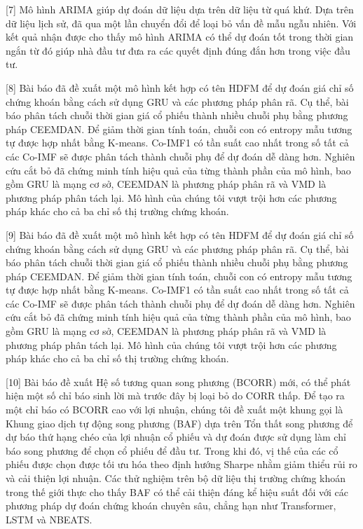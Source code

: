 \documentclass[conference]{IEEEtran}
\begin{document}
[7] Mô hình ARIMA giúp dự đoán dữ liệu dựa trên dữ liệu từ quá khứ. Dựa trên dữ liệu lịch sử, đã qua một lần chuyển đổi để loại bỏ vấn đề mẫu ngẫu nhiên. Với kết quả nhận được cho thấy mô hình ARIMA có thể dự đoán tốt trong thời gian ngắn từ đó giúp nhà đầu tư đưa ra các quyết định đúng đắn hơn trong việc đầu tư.

[8] Bài báo đã đề xuất một mô hình kết hợp có tên HDFM để dự đoán giá chỉ số chứng khoán bằng cách sử dụng GRU và các phương pháp phân rã. Cụ thể, bài báo phân tách chuỗi thời gian giá cổ phiếu thành nhiều chuỗi phụ bằng phương pháp CEEMDAN. Để giảm thời gian tính toán, chuỗi con có entropy mẫu tương tự được hợp nhất bằng K-means. Co-IMF1 có tần suất cao nhất trong số tất cả các Co-IMF sẽ được phân tách thành chuỗi phụ để dự đoán dễ dàng hơn. Nghiên cứu cắt bỏ đã chứng minh tính hiệu quả của từng thành phần của mô hình, bao gồm GRU là mạng cơ sở, CEEMDAN là phương pháp phân rã và VMD là phương pháp phân tách lại. Mô hình của chúng tôi vượt trội hơn các phương pháp khác cho cả ba chỉ số thị trường chứng khoán.

[9] Bài báo đã đề xuất một mô hình kết hợp có tên HDFM để dự đoán giá chỉ số chứng khoán bằng cách sử dụng GRU và các phương pháp phân rã. Cụ thể, bài báo phân tách chuỗi thời gian giá cổ phiếu thành nhiều chuỗi phụ bằng phương pháp CEEMDAN. Để giảm thời gian tính toán, chuỗi con có entropy mẫu tương tự được hợp nhất bằng K-means. Co-IMF1 có tần suất cao nhất trong số tất cả các Co-IMF sẽ được phân tách thành chuỗi phụ để dự đoán dễ dàng hơn. Nghiên cứu cắt bỏ đã chứng minh tính hiệu quả của từng thành phần của mô hình, bao gồm GRU là mạng cơ sở, CEEMDAN là phương pháp phân rã và VMD là phương pháp phân tách lại. Mô hình của chúng tôi vượt trội hơn các phương pháp khác cho cả ba chỉ số thị trường chứng khoán.

[10] Bài báo đề xuất Hệ số tương quan song phương (BCORR) mới, có thể phát hiện một số chỉ báo sinh lời mà trước đây bị loại bỏ do CORR thấp. Để tạo ra một chỉ báo có BCORR cao với lợi nhuận, chúng tôi đề xuất một khung gọi là Khung giao dịch tự động song phương (BAF) dựa trên Tổn thất song phương để dự báo thứ hạng chéo của lợi nhuận cổ phiếu và dự đoán được sử dụng làm chỉ báo song phương để chọn cổ phiếu để đầu tư. Trong khi đó, vị thế của các cổ phiếu được chọn được tối ưu hóa theo định hướng Sharpe nhằm giảm thiểu rủi ro và cải thiện lợi nhuận. Các thử nghiệm trên bộ dữ liệu thị trường chứng khoán trong thế giới thực cho thấy BAF có thể cải thiện đáng kể hiệu suất đối với các phương pháp dự đoán chứng khoán chuyên sâu, chẳng hạn như Transformer, LSTM và NBEATS. 
\end{document}

